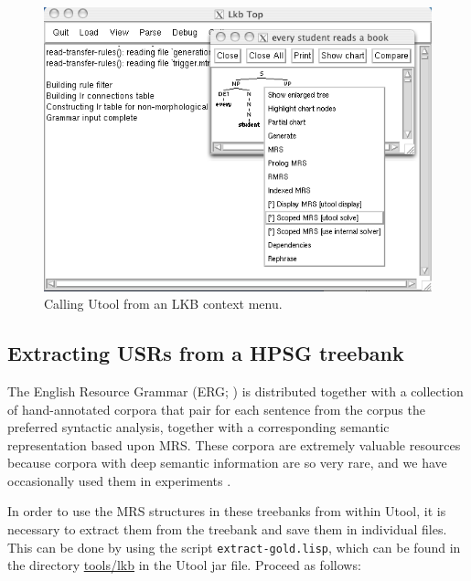 \begin{figure}
\begin{center}
\includegraphics[width=0.8 \textwidth]{lkb-integration}
\end{center}
\caption{Calling Utool from an LKB context menu.
\label{fig:lkb-integration}}
\end{figure}


\subsection{Extracting USRs from a HPSG treebank}
\label{sec:treebank}

The English Resource Grammar (ERG; )
is distributed together with a collection of hand-annotated corpora that pair for each sentence from the corpus
the preferred syntactic analysis, together with a corresponding
semantic representation based upon MRS. These corpora are extremely
valuable resources because corpora with deep semantic information are
so very rare, and we have occasionally used them in experiments
\cite{FucKolNieTha04,FliKolTha05}.

In order to use the MRS structures in these treebanks from within
Utool, it is necessary to extract them from the treebank and save them
in individual files. This can be done by using the script
\verb|extract-gold.lisp|, which can be found in the directory
\url{tools/lkb} in the Utool jar file. Proceed as follows:

